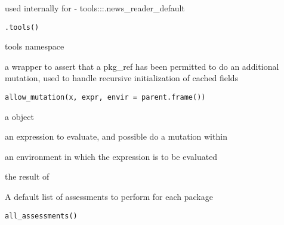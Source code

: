 \documentclass[a4paper]{book}
\begin{document}
%
\begin{Description}
used internally for
- tools:::.news\_reader\_default
\end{Description}
%
\begin{Usage}
\begin{verbatim}
.tools()
\end{verbatim}
\end{Usage}
%
\begin{Value}
tools namespace
\end{Value}
%
\begin{Description}
a wrapper to assert that a pkg\_ref has been permitted to do an additional
mutation, used to handle recursive initialization of cached fields
\end{Description}
%
\begin{Usage}
\begin{verbatim}
allow_mutation(x, expr, envir = parent.frame())
\end{verbatim}
\end{Usage}
%
\begin{Arguments}
\begin{ldescription}
\item[\code{x}] a  object

\item[\code{expr}] an expression to evaluate, and possible do a mutation within

\item[\code{envir}] an environment in which the expression is to be evaluated
\end{ldescription}
\end{Arguments}
%
\begin{Value}
the result of 
\end{Value}
%
\begin{Description}
A default list of assessments to perform for each package
\end{Description}
%
\begin{Usage}
\begin{verbatim}
all_assessments()
\end{verbatim}
\end{Usage}
\end{document}
